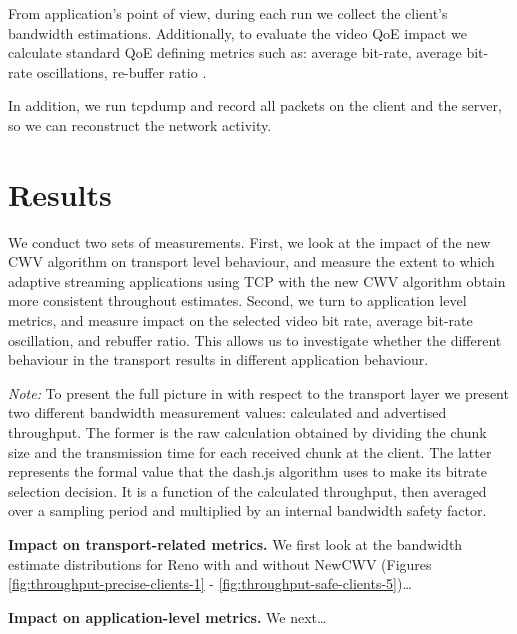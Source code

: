 \documentclass[10pt,sigconf]{acmart}
\begin{document}
From application's point of view, during each run we collect the client's bandwidth estimations. Additionally, to evaluate the video QoE impact we calculate standard QoE defining metrics such as: average bit-rate, average bit-rate oscillations, re-buffer ratio \cite{Spiteri-2019-from-theory-to-practice-sabre, Yin-2015-a-control-theoritic-approach, Dobrian-2013-understanding-the-impact-of-video-quality}.

In addition, we run tcpdump and record all packets on the client and the server, so we can reconstruct the network activity.

\section{Results}

We conduct two sets of measurements. First, we look at the impact of the new CWV algorithm on transport level behaviour, and measure the extent to which adaptive streaming applications using TCP with the new CWV algorithm obtain more consistent throughout estimates. Second, we turn to application level metrics, and measure impact on the selected video bit rate, average bit-rate oscillation, and rebuffer ratio. This allows us to investigate whether the different behaviour in the transport results in different application behaviour.

\textit{Note:} To present the full picture in with respect to the transport layer we present two different bandwidth measurement values: calculated and advertised throughput. The former is the raw calculation obtained by dividing the chunk size and the transmission time for each received chunk at the client. The latter represents the formal value that the dash.js algorithm uses to make its bitrate selection decision. It is a function of the calculated throughput, then averaged over a sampling period and multiplied by an internal bandwidth safety factor.  

\textbf{Impact on transport-related metrics.} We first look at the bandwidth estimate distributions for Reno with and without NewCWV (Figures \ref{fig:throughput-precise-clients-1} - \ref{fig:throughput-safe-clients-5})…




\textbf{Impact on application-level metrics.} We next…

\end{document}

